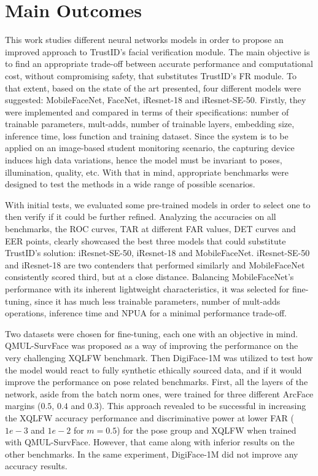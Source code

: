 \documentclass[class=report, crop=false, a4paper, 12pt]{standalone}
\begin{document}
\section{Main Outcomes}
\par This work studies different neural networks models in order to propose an improved approach to TrustID's facial verification module. The main objective is to find an appropriate trade-off between accurate performance and computational cost, without compromising safety, that substitutes TrustID's FR module. To that extent, based on the state of the art presented, four different models were suggested: MobileFaceNet, FaceNet, iResnet-18 and iResnet-SE-50. Firstly, they were implemented and compared in terms of their specifications: number of trainable parameters, mult-adds, number of trainable layers, embedding size, inference time, loss function and training dataset. Since the system is to be applied on an image-based student monitoring scenario, the capturing device induces high data variations, hence the model must be invariant to poses, illumination, quality, etc. With that in mind, appropriate benchmarks were designed to test the methods in a wide range of possible scenarios.

\par With initial tests, we evaluated some pre-trained models in order to select one to then verify if it could be further refined. Analyzing the accuracies on all benchmarks, the ROC curves, TAR at different FAR values, DET curves and EER points, clearly showcased the best three models that could substitute TrustID's solution: iResnet-SE-50, iResnet-18 and MobileFaceNet. iResnet-SE-50 and iResnet-18 are two contenders that performed similarly and MobileFaceNet consistently scored third, but at a close distance. Balancing MobileFaceNet's performance with its inherent lightweight characteristics, it was selected for fine-tuning, since it has much less trainable parameters, number of mult-adds operations, inference time and NPUA for a minimal performance trade-off.

\par Two datasets were chosen for fine-tuning, each one with an objective in mind. QMUL-SurvFace was proposed as a way of improving the performance on the very challenging XQLFW benchmark. Then DigiFace-1M was utilized to test how the model would react to fully synthetic ethically sourced data, and if it would improve the performance on pose related benchmarks. First, all the layers of the network, aside from the batch norm ones, were trained for three different ArcFace margins ($0.5$, $0.4$ and $0.3$). This approach revealed to be successful in increasing the XQLFW accuracy performance and discriminative power at lower FAR ($1e-3$ and $1e-2$ for $m=0.5$) for the pose group and XQLFW when trained with QMUL-SurvFace. However, that came along with inferior results on the other benchmarks. In the same experiment, DigiFace-1M did not improve any accuracy results.  
\end{document}
